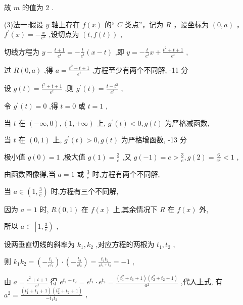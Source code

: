 \documentclass[10pt]{article}
\begin{document}
故 \(m\) 的值为 2 .

(3)法一:假设 \(y\) 轴上存在 \(f\left( x\right)\) 的“ \(C\) 类点”，记为 \(R\) ，设坐标为 \(\left( {0,a}\right)\) ， \({f}^{\prime }\left( x\right)  =  - \frac{x}{{e}^{x}}\) ,设切点为 \(\left( {t,f\left( t\right) }\right)\) ,

切线方程为 \(y - \frac{t + 1}{{e}^{t}} =  - \frac{t}{{e}^{t}}\left( {x - t}\right)\) ,即 \(y =  - \frac{t}{{e}^{t}}x + \frac{{t}^{2} + t + 1}{{e}^{t}}\) ,

过 \(R\left( {0,a}\right)\) ,得 \(a = \frac{{t}^{2} + t + 1}{{e}^{t}}\) ,方程至少有两个不同解, -11 分

设 \(g\left( t\right)  = \frac{{t}^{2} + t + 1}{{e}^{t}}\) ,则 \({g}^{\prime }\left( t\right)  = \frac{t - {t}^{2}}{{e}^{t}}\) ,

令 \({g}^{\prime }\left( t\right)  = 0\) ,得 \(t = 0\) 或 \(t = 1\) ,

当 \(t\) 在 \(\left( {-\infty ,0}\right) ,\left( {1, + \infty }\right)\) 上, \({g}^{\prime }\left( t\right)  < 0,g\left( t\right)\) 为严格减函数,

当 \(t\) 在 \(\left( {0,1}\right)\) 上, \({g}^{\prime }\left( t\right)  > 0,g\left( t\right)\) 为严格增函数, -13 分

极小值 \(g\left( 0\right)  = 1\) ,极大值 \(g\left( 1\right)  = \frac{3}{e}\) ,又 \(g\left( {-1}\right)  = e > \frac{3}{e},g\left( 2\right)  = \frac{6}{{e}^{2}} < 1\) ,

由函数图像得,当 \(a = 1\) 或 \(\frac{3}{e}\) 时,方程有两个不同解,

当 \(a \in  \left( {1,\frac{3}{e}}\right)\) 时,方程有三个不同解,

因为 \(a = 1\) 时, \(R\left( {0,1}\right)\) 在 \(f\left( x\right)\) 上,其余情况下 \(R\) 在 \(f\left( x\right)\) 外,

所以 \(a \in  \left\lbrack  {1,\frac{3}{e}}\right)\) ,

设两垂直切线的斜率为 \({k}_{1},{k}_{2}\) ,对应方程的两根为 \({t}_{1},{t}_{2}\) ,

则 \({k}_{1}{k}_{2} = \left( {-\frac{{t}_{1}}{{e}^{{t}_{1}}}}\right)  \cdot  \left( {-\frac{{t}_{2}}{{e}^{{t}_{2}}}}\right)  = \frac{{t}_{1}{t}_{2}}{{e}^{{t}_{1} + {t}_{2}}} =  - 1\) ,

由 \(a = \frac{{t}^{2} + t + 1}{{e}^{t}}\) 得 \({e}^{{t}_{1} + {t}_{2}} = {e}^{{t}_{1}} \cdot  {e}^{{t}_{2}} = \frac{\left( {{t}_{1}^{2} + {t}_{1} + 1}\right) \left( {{t}_{2}^{2} + {t}_{2} + 1}\right) }{{a}^{2}}\) ,代入上式, 有 \({a}^{2} = \frac{\left( {{t}_{1}^{2} + {t}_{1} + 1}\right) \left( {{t}_{2}^{2} + {t}_{2} + 1}\right) }{-{t}_{1}{t}_{2}}\) ,
\end{document}
